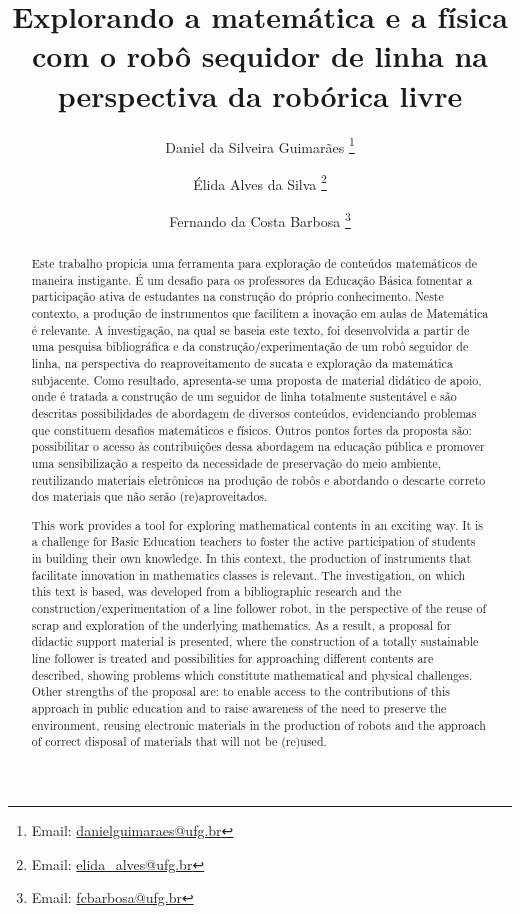 \documentclass{textolivre}
\title{Explorando a matemática e a física com o robô sequidor de linha na perspectiva da robórica livre}
\author[1]{Daniel da Silveira Guimarães \orcid{0000-0003-1973-9609} \thanks{Email: \url{danielguimaraes@ufg.br}}}
\author[1]{Élida Alves da Silva \orcid{0000-0001-5417-9083} \thanks{Email: \url{elida_alves@ufg.br}}}
\author[1]{Fernando da Costa Barbosa \orcid{0000-0001-8558-3521} \thanks{Email: \url{fcbarbosa@ufg.br}}}
\affil[1]{Universidade Federal de Goiás, Brasil.}
\begin{document}
\maketitle

\begin{polyabstract}
\begin{abstract}
Este trabalho propicia uma ferramenta para exploração de conteúdos matemáticos 
de maneira instigante. É um desafio para os professores da Educação Básica
fomentar a participação ativa de estudantes na construção do próprio
conhecimento. Neste contexto, a produção de instrumentos que facilitem a
inovação em aulas de Matemática é relevante. A investigação, na qual se baseia
este texto, foi desenvolvida a partir de uma pesquisa bibliográfica e da
construção/experimentação de um robô seguidor de linha, na perspectiva do
reaproveitamento de sucata e exploração da matemática subjacente. Como
resultado, apresenta-se uma proposta de material didático de apoio, onde é
tratada a construção de um seguidor de linha totalmente sustentável e são
descritas possibilidades de abordagem de diversos conteúdos, evidenciando
problemas que constituem desafios matemáticos e físicos. Outros pontos fortes
da proposta são: possibilitar o acesso às contribuições dessa abordagem na
educação pública e promover uma sensibilização a respeito da necessidade de
preservação do meio ambiente, reutilizando materiais eletrônicos na produção de
robôs e abordando o descarte correto dos materiais que não serão
(re)aproveitados.

\end{abstract}

\begin{english}
\begin{abstract}
This work provides a tool for exploring mathematical contents in an exciting
way. It is a challenge for Basic Education teachers to foster the active
participation of students in building their own knowledge. In this context, the
production of instruments that facilitate innovation in mathematics classes is
relevant. The investigation, on which this text is based, was developed from a
bibliographic research and the construction/experimentation of a line follower
robot, in the perspective of the reuse of scrap and exploration of the
underlying mathematics. As a result, a proposal for didactic support material
is presented, where the construction of a totally sustainable line follower is
treated and possibilities for approaching different contents are described,
showing problems which constitute mathematical and physical challenges. Other
strengths of the proposal are: to enable access to the contributions of this
approach in public education and to raise awareness of the need to preserve the
environment, reusing electronic materials in the production of robots and the
approach of correct disposal of materials that will not be (re)used.


\end{abstract}
\end{english}
\end{polyabstract}
\end{document}
